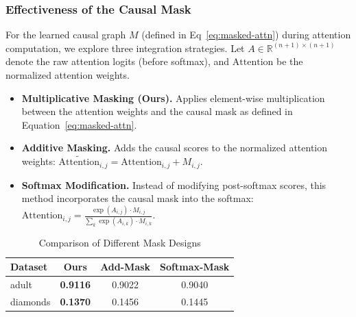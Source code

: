 \documentclass[sigconf, nonacm]{acmart}
\newcommand{\rlend}[1]{{\color{black}#1}}
\newcommand{\syfix}[1]{{\color{black}#1}}
\newcommand{\syne}[1]{{\color{black}#1}}
\newcommand{\vldb}[1]{{\color{red}#1}}
\begin{document}
\subsubsection{Effectiveness of the Causal Mask}
\rlend{
For the learned causal graph \syfix{$M$ (defined in Eq~\ref{eq:masked-attn})} during attention computation, we explore three integration strategies. 
Let $A \in \mathbb{R}^{(n+1) \times (n+1)}$ denote the raw attention logits (before softmax), and $\text{Attention}$ be the normalized attention weights. }
\vldb{
\begin{itemize}
    \item \textbf{Multiplicative Masking (Ours).} Applies element-wise multiplication between the attention weights and the causal mask as defined in Equation~\ref{eq:masked-attn}.
    
    \item \textbf{Additive Masking.} Adds the causal scores to the normalized attention weights: $\tilde{\text{Attention}}_{i,j} = \text{Attention}_{i,j} + M_{i,j}$.
    
    \item \textbf{Softmax Modification.} Instead of modifying post-softmax scores, this method incorporates the causal mask into the softmax: $\text{Attention}_{i,j} = \frac{\exp(A_{i,j}) \cdot M_{i,j}}{\sum_k \exp(A_{i,k}) \cdot M_{i,k}}$.
\end{itemize}
}

\begin{table}[h]
    \centering
    \small
    \caption{Comparison of Different Mask Designs}
    \label{tab:mask_comparison}
    \begin{tabular}{lccc}
        \toprule
        Dataset & Ours & Add-Mask & Softmax-Mask \\
        \midrule
        adult   &\syne{ \textbf{0.9116}} & \syne{0.9022} & \syne{0.9040} \\
        diamonds & \syne{\textbf{0.1370}} & \syne{0.1456} & \syne{0.1445} \\
        \bottomrule
    \end{tabular}
\end{table}
\end{document}
